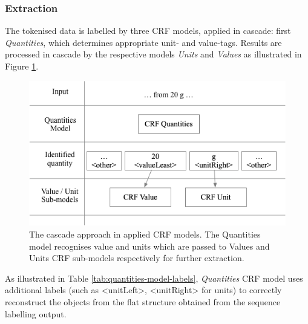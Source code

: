 \documentclass[sigconf]{acmart}
\begin{document}
\subsubsection{Extraction}
The tokenised data is labelled by three CRF models, applied in cascade: first \textit{Quantities}, which determines appropriate unit- and value-tags. Results are processed in cascade by the respective models \textit{Units} and \textit{Values} as illustrated in Figure \ref{fig:schema-cascade}.  

\begin{figure}[ht]
  \centering
  \includegraphics[width=\linewidth]{images/schema-cascade}
  \caption{The cascade approach in applied CRF models. The Quantities model recognises value and units which are  passed to Values and Units CRF sub-models respectively for further extraction.}
  \label{fig:schema-cascade}
\end{figure}

As illustrated in Table \ref{tab:quantities-model-labels}, \textit{Quantities} CRF model uses additional labels (such as <unitLeft>, <unitRight> for units) to correctly reconstruct the objects from the flat structure obtained from the sequence labelling output.
\end{document}
